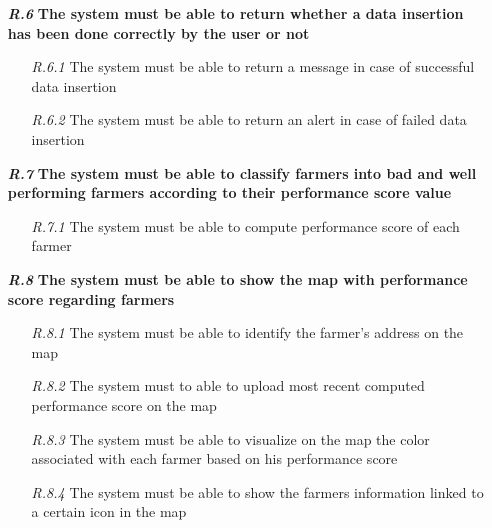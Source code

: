 \begin{itemize}
        \item [\textbf{\textit{R.6}}] \textbf{The system must be able to return whether a data insertion has been done correctly by the user or not}
        \begin{itemize}
            \item [\textit{R.6.1}] The system must be able to return a message in case of successful data insertion
	        \item [\textit{R.6.2}]  The system must be able to return an alert in case of failed data insertion
        \end{itemize}
        \item [\textbf{\textit{R.7}}] \textbf{The system must be able to classify farmers into bad and well performing farmers according to their performance score value }
        \begin{itemize}
            \item [\textit{R.7.1}] The system must be able to compute performance score of each farmer
        \end{itemize}
        
        \item [\textbf{\textit{R.8}}] \textbf{The system must be able to show the map with performance score regarding farmers}
        \begin{itemize}
            \item [\textit{R.8.1}] The system must be able to identify the farmer’s address on the map
	        \item [\textit{R.8.2}] The system must to able to upload most recent computed performance score on the map
	        \item [\textit{R.8.3}] The system must be able to visualize on the map the color associated with each farmer based on his performance score
	        \item [\textit{R.8.4}] The system must be able to show the farmers information linked to a certain icon in the map
        \end{itemize}



\end{itemize}
